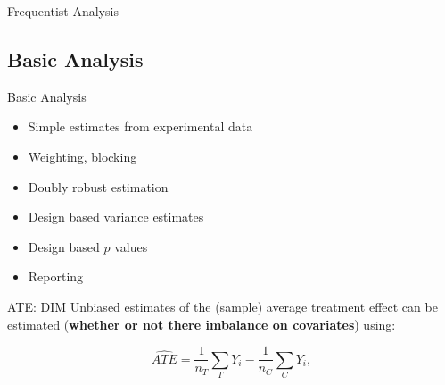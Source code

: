 \documentclass[
  11pt,
  ignorenonframetext,
]{beamer}
\providecommand{\tightlist}{%
  \setlength{\itemsep}{0pt}\setlength{\parskip}{0pt}}\usepackage{longtable,booktabs,array}
\begin{document}
\begin{frame}{Frequentist Analysis \label{L_inference}}
\hyperlink{ideas}{}
\end{frame}

\hypertarget{basic-analysis}{%
\subsection{\texorpdfstring{Basic Analysis
\label{nools}}{Basic Analysis }}\label{basic-analysis}}

\begin{frame}{Basic Analysis \label{nools}}
\begin{itemize}
\tightlist
\item
  Simple estimates from experimental data
\item
  Weighting, blocking
\item
  Doubly robust estimation
\item
  Design based variance estimates
\item
  Design based \(p\) values
\item
  Reporting
\end{itemize}
\end{frame}

\begin{frame}{ATE: DIM}
\protect\hypertarget{ate-dim}{}
Unbiased estimates of the (sample) average treatment effect can be
estimated (\textbf{whether or not there imbalance on covariates}) using:

\[
\widehat{ATE} = \frac{1}{n_T}\sum_TY_i - \frac{1}{n_C}\sum_CY_i,
\]
\end{frame}
\end{document}
